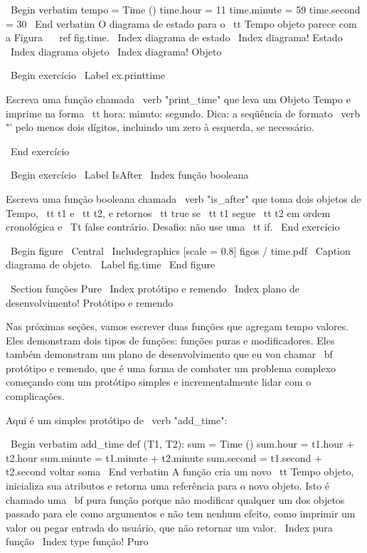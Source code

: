 \documentclass[10pt]{book}
\begin{document}
\begin {itemize}
{{{{{{{{{{{{{\ Begin {verbatim}
tempo = Time ()
time.hour = 11
time.minute = 59
time.second = 30
\ End {verbatim}
%
O diagrama de estado para o {\ tt Tempo} objeto parece com a Figura ~ \ ref {} fig.time.
\ Index {diagrama de estado}
\ Index {diagrama! Estado}
\ Index {diagrama objeto}
\ Index {diagrama! Objeto}

\ Begin {} exercício
\ Label {} ex.printtime

Escreva uma função chamada \ verb "print_time" que leva um 
Objeto Tempo e imprime na forma {\ tt hora: minuto: segundo}.
Dica: a seqüência de formato \ verb "'%
pelo menos dois dígitos, incluindo um zero à esquerda, se necessário.

\ End {} exercício

\ Begin {} exercício
\ Label {} IsAfter
\ Index {função booleana}

Escreva uma função booleana chamada \ verb "is_after" que
toma dois objetos de Tempo, {\ tt t1} e {\ tt t2}, e
retornos {\ tt true} se {\ tt t1} segue {\ tt t2} em ordem cronológica e
{\ Tt false} contrário. Desafio: não use uma {\ tt if}.
\ End {} exercício

\ Begin {figure}
\ Central
{\ Includegraphics [scale = 0.8] {figos / time.pdf}}
\ Caption {diagrama de objeto.}
\ Label {} fig.time
\ End {figure}


\ Section {funções Pure}
\ Index {protótipo e remendo}
\ Index {plano de desenvolvimento! Protótipo e remendo}

Nas próximas seções, vamos escrever duas funções que agregam tempo
valores. Eles demonstram dois tipos de funções: funções puras e
modificadores. Eles também demonstram um plano de desenvolvimento que eu vou chamar {\ bf
  protótipo e remendo}, que é uma forma de combater um problema complexo
começando com um protótipo simples e incrementalmente lidar com o
complicações.

Aqui é um simples protótipo de \ verb "add_time":

\ Begin {verbatim}
add_time def (T1, T2):
    sum = Time ()
    sum.hour = t1.hour + t2.hour
    sum.minute = t1.minute + t2.minute
    sum.second = t1.second + t2.second
    voltar soma
\ End {verbatim}
%
A função cria um novo {\ tt Tempo} objeto, inicializa sua
atributos e retorna uma referência para o novo objeto. Isto é chamado
uma {\ bf pura função} porque não modificar qualquer um dos objetos
passado para ele como argumentos e não tem nenhum efeito,
como imprimir um valor ou pegar entrada do usuário, 
que não retornar um valor.
\ Index {pura função}
\ Index {type função! Puro}

}}}}}}}}}}}}}
\end{itemize}
\end{document}
